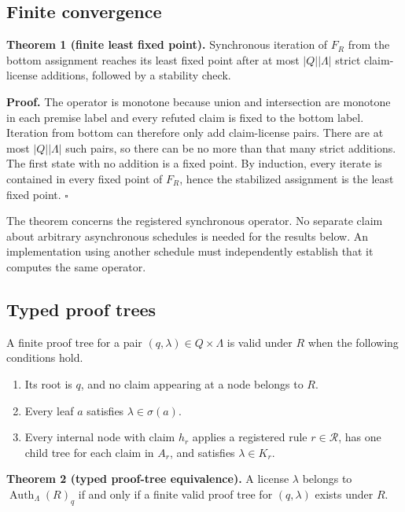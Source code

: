 \documentclass[pdflatex,sn-mathphys-num]{sn-jnl}
\providecommand{\tightlist}{%
  \setlength{\itemsep}{0pt}\setlength{\parskip}{0pt}}
\begin{document}
\subsection{Finite convergence}\label{finite-convergence}

\textbf{Theorem 1 (finite least fixed point).} Synchronous iteration of \(F_R\) from the bottom assignment reaches its least fixed point after at most \(|Q||\Lambda|\) strict claim-license additions, followed by a stability check.

\textbf{Proof.} The operator is monotone because union and intersection are monotone in each premise label and every refuted claim is fixed to the bottom label. Iteration from bottom can therefore only add claim-license pairs. There are at most \(|Q||\Lambda|\) such pairs, so there can be no more than that many strict additions. The first state with no addition is a fixed point. By induction, every iterate is contained in every fixed point of \(F_R\), hence the stabilized assignment is the least fixed point. \(\square\)

The theorem concerns the registered synchronous operator. No separate claim about arbitrary asynchronous schedules is needed for the results below. An implementation using another schedule must independently establish that it computes the same operator.

\subsection{Typed proof trees}\label{typed-proof-trees}

A finite proof tree for a pair \((q,\lambda)\in Q\times\Lambda\) is valid under \(R\) when the following conditions hold.

\begin{enumerate}
\def\labelenumi{\arabic{enumi}.}
\tightlist
\item
  Its root is \(q\), and no claim appearing at a node belongs to \(R\).
\item
  Every leaf \(a\) satisfies \(\lambda\in\sigma(a)\).
\item
  Every internal node with claim \(h_r\) applies a registered rule \(r\in\mathcal{R}\), has one child tree for each claim in \(A_r\), and satisfies \(\lambda\in K_r\).
\end{enumerate}

\textbf{Theorem 2 (typed proof-tree equivalence).} A license \(\lambda\) belongs to \(\operatorname{Auth}_\Lambda(R)_q\) if and only if a finite valid proof tree for \((q,\lambda)\) exists under \(R\).
\end{document}
